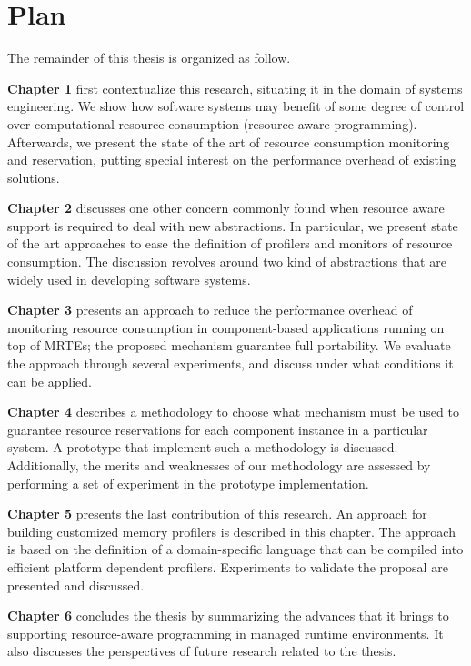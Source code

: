 \section{Plan}

The remainder of this thesis is organized as follow.

\textbf{Chapter 1} first contextualize this research, situating it in the domain of systems engineering.
We show how software systems may benefit of some degree of control over computational resource consumption (resource aware programming).
Afterwards, we present the state of the art of resource consumption monitoring and reservation, putting special interest on the performance overhead of existing solutions.

\textbf{Chapter 2} discusses one other concern commonly found when resource aware support is required to deal with new abstractions.
In particular, we present state of the art approaches to ease the definition of profilers and monitors of resource consumption.
The discussion revolves around two kind of abstractions that are widely used in developing software systems.

\textbf{Chapter 3} presents an approach to reduce the performance overhead of monitoring resource consumption in component-based applications running on top of MRTEs; the proposed mechanism guarantee full portability.
We evaluate the approach through several experiments, and discuss under what conditions it can be applied.

\textbf{Chapter 4} describes a methodology to choose what mechanism must be used to guarantee resource reservations for each component instance in a particular system.
A prototype that implement such a methodology is discussed.
Additionally, the merits and weaknesses of our methodology are assessed by performing a set of experiment in the prototype implementation.

\textbf{Chapter 5} presents the last contribution of this research.
An approach for building customized memory profilers is described in this chapter.
The approach is based on the definition of a domain-specific language that can be compiled into efficient platform dependent profilers.
Experiments to validate the proposal are presented and discussed.

\textbf{Chapter 6} concludes the thesis by summarizing the advances that it brings to supporting resource-aware programming in managed runtime environments.
It also discusses the perspectives of future research related to the thesis.

